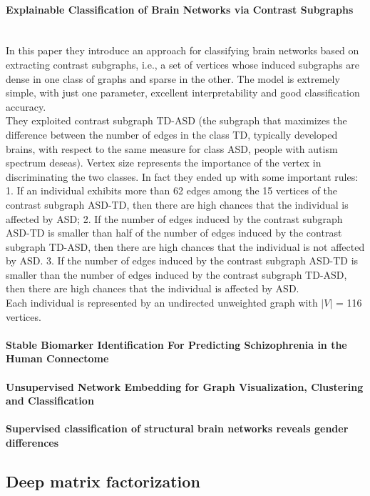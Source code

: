 \paragraph{Explainable Classification of Brain Networks via Contrast Subgraphs}\
\\

In this paper they introduce an approach for classifying brain networks based on extracting contrast subgraphs, i.e., a set of vertices whose induced subgraphs are dense in one class of graphs and sparse in the other. The model is extremely simple, with just one parameter, excellent interpretability and good classification accuracy. 
\\
They exploited contrast subgraph TD-ASD (the subgraph that maximizes the difference between the number of edges in the class TD, typically developed brains, with respect to the same measure for class ASD, people with autism spectrum deseas). Vertex size represents the importance of the vertex in discriminating the two classes. In fact they ended up with some important rules:
1. If an individual exhibits more than 62 edges among the 15 vertices of the contrast subgraph ASD-TD, then there are high chances that the individual is affected by ASD; 2. If the number of edges induced by the contrast subgraph ASD-TD is smaller than half of the number of edges induced by the contrast subgraph TD-ASD, then there are high chances that the individual is not affected by ASD. 3. If the number of edges induced by the contrast subgraph ASD-TD is smaller than the number of edges induced by the contrast subgraph TD-ASD, then there are high chances that the individual is affected by ASD.
\\
Each individual is represented by an undirected unweighted graph with $|V|$ = 116 vertices.
\paragraph{Stable Biomarker Identification For Predicting Schizophrenia in the Human Connectome}
\paragraph{Unsupervised Network Embedding for Graph Visualization, Clustering and Classification}
\paragraph{Supervised classification of structural brain networks reveals gender differences}
\subsection{Deep matrix factorization}
